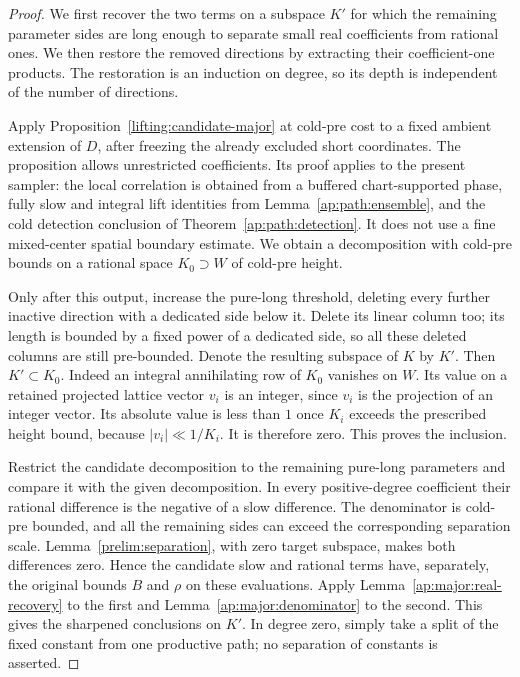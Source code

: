 \begin{proof}
We first recover the two terms on a subspace $K'$ for which the
remaining parameter sides are long enough to separate small real
coefficients from rational ones. We then restore the removed
directions by extracting their coefficient-one products. The
restoration is an induction on degree, so its depth is independent
of the number of directions.

Apply Proposition~\ref{lifting:candidate-major} at cold-pre cost to
a fixed ambient extension of $D$, after freezing the already
excluded short coordinates.  The proposition allows unrestricted
coefficients.  Its proof applies to the present sampler: the local
correlation is obtained from a buffered chart-supported phase,
fully slow and integral lift identities from
Lemma~\ref{ap:path:ensemble}, and the cold detection conclusion of
Theorem~\ref{ap:path:detection}.  It
does not use a fine mixed-center spatial boundary estimate.  We
obtain a decomposition with cold-pre bounds on a rational space
$K_0\supset W$ of cold-pre height.

Only after this output, increase the pure-long threshold, deleting
every further inactive direction with a dedicated side below it.
Delete its linear column too; its length is bounded by a fixed
power of a dedicated side, so all these deleted columns are still
pre-bounded.  Denote the resulting subspace of $K$ by $K'$.  Then
$K'\subset K_0$.  Indeed an integral annihilating row of $K_0$
vanishes on $W$.  Its value on a retained projected lattice vector
$v_i$ is an integer, since $v_i$ is the projection of an integer
vector.  Its absolute value is less than $1$ once $K_i$ exceeds
the prescribed height bound, because $|v_i|\ll 1/K_i$.  It is
therefore zero.  This proves the inclusion.

Restrict the candidate decomposition to the remaining pure-long
parameters and compare it with the given decomposition.  In every
positive-degree coefficient their rational difference is the
negative of a slow difference.  The denominator is cold-pre
bounded, and all the remaining sides can exceed the corresponding
separation scale.  Lemma~\ref{prelim:separation}, with zero target
subspace, makes both differences zero.  Hence the candidate slow
and rational terms have, separately, the original bounds $B$ and
$\rho$ on these evaluations.  Apply
Lemma~\ref{ap:major:real-recovery} to the first and
Lemma~\ref{ap:major:denominator} to the second.  This gives the
sharpened conclusions on $K'$.  In degree zero, simply take a split
of the fixed constant from one productive path; no separation of
constants is asserted.


\end{proof}
